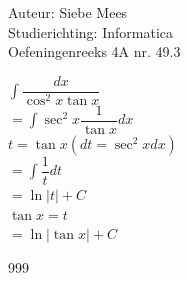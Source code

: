 \documentclass[a4paper]{article}
\begin{document}
  
\noindent \large Auteur: Siebe Mees \\
\noindent \large Studierichting: Informatica\\
\noindent \large Oefeningenreeks 4A nr. 49.3\\

\medskip

\normalsize

$ \displaystyle\int \dfrac{dx}{\cos^2 x \tan x} $\\

$ = \displaystyle\int \sec^2 x \dfrac{1}{\tan x} dx $\\

$ t = \tan x \left(dt = \sec^2 x dx \right) $\\

$ = \displaystyle\int \dfrac{1}{t} dt $\\

$ = \ln \left| t \right| + C $\\

$ \tan x = t $\\

$ = \ln \left| \tan x \right| + C $\\

\begin{thebibliography}{999}
\end{thebibliography}
\end{document}
